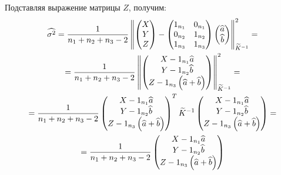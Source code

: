 Подставляя выражение матрицы $Z$, получим:
\begin{multline}
    \widehat{\sigma^2}
    = \frac{1}{n_1 + n_2 + n_3 - 2}
    \left \| {
        \begin{pmatrix}
            X \\
            Y \\
            Z
        \end{pmatrix}
        -
        \begin{pmatrix}
            1_{n_1} & 0_{n_1} \\
            0_{n_2} & 1_{n_2} \\
            1_{n_3} & 1_{n_3} \\
        \end{pmatrix}
        \begin{pmatrix}
            \widehat{a} \\
            \widehat{b}
        \end{pmatrix}
    } \right \|_{\widetilde{K}^{-1}}^2
    = \\
    = \frac{1}{n_1 + n_2 + n_3 - 2}
    \left \| {
        \begin{pmatrix}
            X - 1_{n_1} \widehat{a} \\
            Y - 1_{n_2} \widehat{b} \\
            Z - 1_{n_3} \left ( \widehat{a} + \widehat{b} \right )
        \end{pmatrix}
    } \right \|_{\widetilde{K}^{-1}}^2
    = \\
    = \frac{1}{n_1 + n_2 + n_3 - 2}
    \begin{pmatrix}
        X - 1_{n_1} \widehat{a} \\
        Y - 1_{n_2} \widehat{b} \\
        Z - 1_{n_3} \left ( \widehat{a} + \widehat{b} \right )
    \end{pmatrix}^T
    \widetilde{K}^{-1}
    \begin{pmatrix}
        X - 1_{n_1} \widehat{a} \\
        Y - 1_{n_2} \widehat{b} \\
        Z - 1_{n_3} \left ( \widehat{a} + \widehat{b} \right )
    \end{pmatrix} = \\
    = \frac{1}{n_1 + n_2 + n_3 - 2}
    \begin{pmatrix}
        X - 1_{n_1} \widehat{a} \\
        Y - 1_{n_2} \widehat{b} \\
        Z - 1_{n_3} \left ( \widehat{a} + \widehat{b} \right )

\end{pmatrix}
\end{multline}
